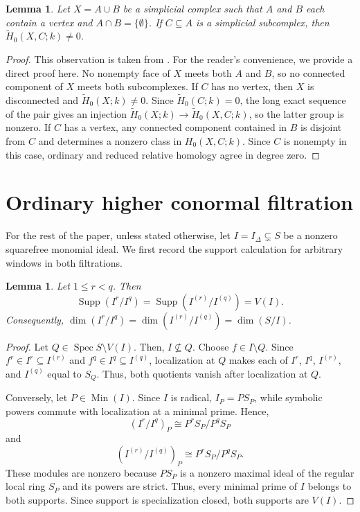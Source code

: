 \documentclass[10pt,a4paper]{amsart}
\newtheorem{lemma}[theorem]{Lemma}
\begin{document}
\begin{lemma}\label{lem:relative-zero}
	Let $X=A\cup B$ be a simplicial complex such that $A$ and $B$ each contain a
	vertex and $A\cap B=\{\emptyset\}$. If $C\subseteq A$ is a simplicial
	subcomplex, then $\widetilde H_0(X,C;k)\neq0$.
\end{lemma}

\begin{proof} This observation is taken from \cite[Lemma 3.1]{MinhNakamura}. For the reader's convenience, we provide a direct proof here. No nonempty face of $X$ meets both $A$ and $B$, so no connected component of
	$X$ meets both subcomplexes. If $C$ has no vertex, then $X$ is disconnected and
	$\widetilde H_0(X;k)\neq0$. Since $\widetilde H_0(C;k)=0$, the long exact
	sequence of the pair gives an injection
	$\widetilde H_0(X;k)\to\widetilde H_0(X,C;k)$, so the latter group is nonzero.
	If $C$ has a vertex, any connected component contained in $B$ is disjoint from
	$C$ and determines a nonzero class in $H_0(X,C;k)$. Since $C$ is nonempty in
	this case, ordinary and reduced relative homology agree in degree zero.
\end{proof}

\section{Ordinary higher conormal filtration}\label{sec:ordinary}

For the rest of the paper, unless stated otherwise, let
$I=I_\Delta\subsetneq S$ be a nonzero squarefree monomial ideal. We first
record the support calculation for arbitrary windows in both filtrations.

\begin{lemma}\label{lem:support}
Let $1\le r<q$. Then
$$
\operatorname{Supp}(I^r/I^q)
=
\operatorname{Supp}(I^{(r)}/I^{(q)})
=
V(I).
$$
Consequently,
$\dim(I^r/I^q)=\dim(I^{(r)}/I^{(q)})=\dim(S/I)$.
\end{lemma}

\begin{proof} Let $Q \in \operatorname{Spec } S \setminus V(I)$. Then, $I \not\subseteq Q$. Choose $f\in I\setminus Q$. Since
$f^r\in I^r\subseteq I^{(r)}$ and $f^q\in I^q\subseteq I^{(q)}$,
localization at $Q$ makes each of $I^r$, $I^q$, $I^{(r)}$, and $I^{(q)}$
equal to $S_Q$. Thus, both quotients vanish after localization at $Q$.

Conversely, let $P\in\operatorname{Min}(I)$. Since $I$ is radical,
$I_P=PS_P$, while symbolic powers commute with localization at a minimal
prime. Hence,
$$
(I^r/I^q)_P\cong P^rS_P/P^qS_P
$$
and
$$
(I^{(r)}/I^{(q)})_P\cong P^rS_P/P^qS_P.
$$
These modules are nonzero because $PS_P$ is a nonzero maximal ideal of the regular local ring $S_P$ and its powers are strict. Thus, every minimal prime of $I$
belongs to both supports. Since support is specialization closed, both supports
are $V(I)$.
\end{proof}
\end{document}
